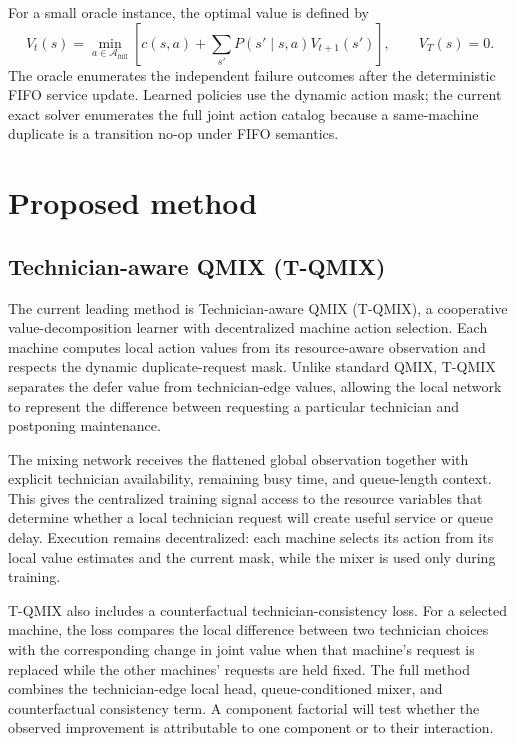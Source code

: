 \documentclass[11pt]{article}
\begin{document}
For a small oracle instance, the optimal value is defined by
\begin{equation}
    V_t(s)=\min_{a\in\mathcal{A}_{\mathrm{full}}}\left[c(s,a)+\sum_{s'}P(s'\mid s,a)V_{t+1}(s')\right],
    \qquad V_T(s)=0.
\end{equation}
The oracle enumerates the independent failure outcomes after the deterministic FIFO service update. Learned policies use the dynamic action mask; the current exact solver enumerates the full joint action catalog because a same-machine duplicate is a transition no-op under FIFO semantics.

\section{Proposed method}

\subsection{Technician-aware QMIX (T-QMIX)}

The current leading method is Technician-aware QMIX (T-QMIX), a cooperative value-decomposition learner with decentralized machine action selection. Each machine computes local action values from its resource-aware observation and respects the dynamic duplicate-request mask. Unlike standard QMIX, T-QMIX separates the defer value from technician-edge values, allowing the local network to represent the difference between requesting a particular technician and postponing maintenance.

The mixing network receives the flattened global observation together with explicit technician availability, remaining busy time, and queue-length context. This gives the centralized training signal access to the resource variables that determine whether a local technician request will create useful service or queue delay. Execution remains decentralized: each machine selects its action from its local value estimates and the current mask, while the mixer is used only during training.

T-QMIX also includes a counterfactual technician-consistency loss. For a selected machine, the loss compares the local difference between two technician choices with the corresponding change in joint value when that machine's request is replaced while the other machines' requests are held fixed. The full method combines the technician-edge local head, queue-conditioned mixer, and counterfactual consistency term. A component factorial will test whether the observed improvement is attributable to one component or to their interaction.
\end{document}
